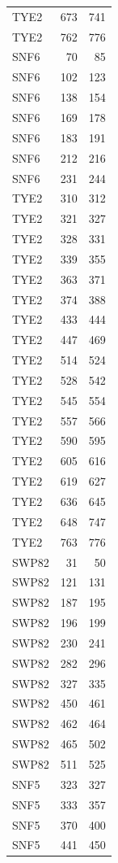 \begin{longtable}{@{}lrr@{}}
  TYE2 & 673 & 741 \\
  TYE2 & 762 & 776 \\
  SNF6 & 70 & 85 \\
  SNF6 & 102 & 123 \\
  SNF6 & 138 & 154 \\
  SNF6 & 169 & 178 \\
  SNF6 & 183 & 191 \\
  SNF6 & 212 & 216 \\
  SNF6 & 231 & 244 \\
  TYE2 & 310 & 312 \\
  TYE2 & 321 & 327 \\
  TYE2 & 328 & 331 \\
  TYE2 & 339 & 355 \\
  TYE2 & 363 & 371 \\
  TYE2 & 374 & 388 \\
  TYE2 & 433 & 444 \\
  TYE2 & 447 & 469 \\
  TYE2 & 514 & 524 \\
  TYE2 & 528 & 542 \\
  TYE2 & 545 & 554 \\
  TYE2 & 557 & 566 \\
  TYE2 & 590 & 595 \\
  TYE2 & 605 & 616 \\
  TYE2 & 619 & 627 \\
  TYE2 & 636 & 645 \\
  TYE2 & 648 & 747 \\
  TYE2 & 763 & 776 \\
  SWP82 & 31 & 50 \\
  SWP82 & 121 & 131 \\
  SWP82 & 187 & 195 \\
  SWP82 & 196 & 199 \\
  SWP82 & 230 & 241 \\
  SWP82 & 282 & 296 \\
  SWP82 & 327 & 335 \\
  SWP82 & 450 & 461 \\
  SWP82 & 462 & 464 \\
  SWP82 & 465 & 502 \\
  SWP82 & 511 & 525 \\
  SNF5 & 323 & 327 \\
  SNF5 & 333 & 357 \\
  SNF5 & 370 & 400 \\
  SNF5 & 441 & 450 \\

\end{longtable}

